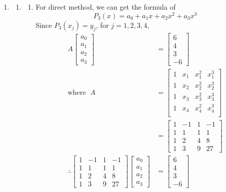 \documentclass{article}
\begin{document}




\begin{enumerate}
\item
\begin{enumerate}

\item
\begin{enumerate}
\item
For direct method, we can get the formula of \[P_3(x) = a_0+a_1x+a_2x^2+a_3x^3\]
Since $P_3(x_j) = y_j$, for $j = 1,2,3,4$, \begin{align*}
A\begin{bmatrix}
a_0\\a_1\\a_2\\a_3
\end{bmatrix} &=\begin{bmatrix}
6\\4\\3\\-6
\end{bmatrix}\\
\mbox{where }\; A &=\begin{bmatrix}
1&x_1&x_1^2&x_1^3\\
1&x_2&x_2^2&x_2^3\\
1&x_3&x_3^2&x_3^3\\
1&x_4&x_4^2&x_4^3\\
\end{bmatrix}\\
&=\begin{bmatrix}
1&-1&1&-1\\
1&1&1&1\\
1&2&4&8\\
1&3&9&27
\end{bmatrix}\\
\therefore \begin{bmatrix}
1&-1&1&-1\\
1&1&1&1\\
1&2&4&8\\
1&3&9&27
\end{bmatrix}\begin{bmatrix}
a_0\\a_1\\a_2\\a_3
\end{bmatrix} &=\begin{bmatrix}6\\4\\3\\-6

\end{bmatrix}
\end{align*}
\end{enumerate}
\end{enumerate}
\end{enumerate}
\end{document}
